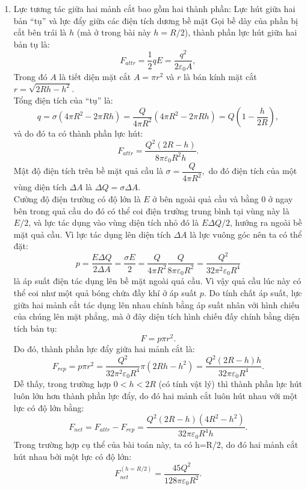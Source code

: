 \begin{loigiai}
\begin{enumerate}[1)]
\begin{center}
    \end{center}
    \item Lực tương tác giữa hai mảnh cắt bao gồm hai thành phần: Lực hút giữa hai bản ``tụ'' và lực đẩy giữa các điện tích dương bề mặt 
    Gọi bề dày của phần bị cắt bên trái là $h$ (mà ở trong bài này $h = R/2$), thành phần lực hút giữa hai bản tụ là:
    $$F_{attr}=\dfrac{1}{2}qE=\dfrac{q^2}{2\varepsilon_0 A},$$
    Trong đó $A$ là tiết diện mặt cắt $A=\pi r^2$ và $r$ là bán kính mặt cắt $r=\sqrt{2Rh-h^2}$.
    \\Tổng điện tích của ``tụ'' là:
    $$q=\sigma (4\pi R^2-2 \pi Rh)=\dfrac{Q}{4\pi R^2}(4\pi R^2-2\pi Rh)=Q(1-\dfrac{h}{2R}),$$
    và do đó ta có thành phần lực hút: 
    $$F_{attr}=\dfrac{Q^2(2R-h)}{8\pi \varepsilon_0 R^2 h}.$$
    Mật độ điện tích trên bề mặt quả cầu là $\sigma=\dfrac{Q}{4\pi R^2},$
    do đó điện tích của một vùng diện tích $\Delta A$ là $\Delta Q=\sigma \Delta A$.\\Cường độ điện trường có độ lớn là $E$ ở bên ngoài quả cầu và bằng $0$ ở ngay bên trong quả cầu do đó có thể coi điện trường trung bình tại vùng này là $E/2$, và lực tác dụng vào vùng diện tích nhỏ đó là $E \Delta Q/2$, hướng ra ngoài bề mặt quả cầu.
    Vì lực tác dụng lên diện tích $\Delta A$ là lực vuông góc nên ta có thể đặt:
    $$p=\dfrac{E\Delta Q}{2\Delta A}=\dfrac{\sigma E}{2}=\dfrac{Q}{4\pi R^2} \dfrac{Q}{8\pi \varepsilon_0 R^2}=\dfrac{Q^2}{32 \pi^2\varepsilon_0 R^4}$$
    là áp suất điện tác dụng lên bề mặt ngoài quả cầu. Vì vậy quả cầu lúc này có thể coi như một quả bóng chứa đầy khí ở áp suất $p$. Do tính chất áp suất, lực giữa hai mảnh cắt tác dụng lên nhau chính bằng áp suất nhân với hình chiếu của chúng lên mặt phẳng, mà ở đây diện tích hình chiếu đấy chính bằng diện tích bản tụ:
    $$F=p\pi r^2.$$
    Do đó, thành phần lực đẩy giữa hai mảnh cắt là:
    $$F_{rep}=p\pi r^2=\dfrac{Q^2}{32\pi^2\varepsilon_0R^4}\pi (2Rh-h^2)=\dfrac{Q^2(2R-h)h}{32\pi \varepsilon_0R^4}.$$
    Dễ thấy, trong trường hợp $0<h<2R$ (có tính vật lý) thì thành phần lực hút luôn lớn hơn thành phần lực đẩy, do đó hai mảnh cắt luôn hút nhau với một lực có độ lớn bằng:
    $$F_{net}=F_{attr}-F_{rep}=\dfrac{Q^2(2R-h)(4R^2-h^2)}{32\pi \varepsilon_0 R^4h}.$$
    Trong trường hợp cụ thể của bài toán này, ta có h=R/2, do đó hai mảnh cắt hút nhau bởi một lực có độ lớn:
    $$F_{net}^{(h=R/2)}=\dfrac{45Q^2}{128\pi \varepsilon_0 R^2}.$$

    \end{enumerate}
\end{loigiai}


